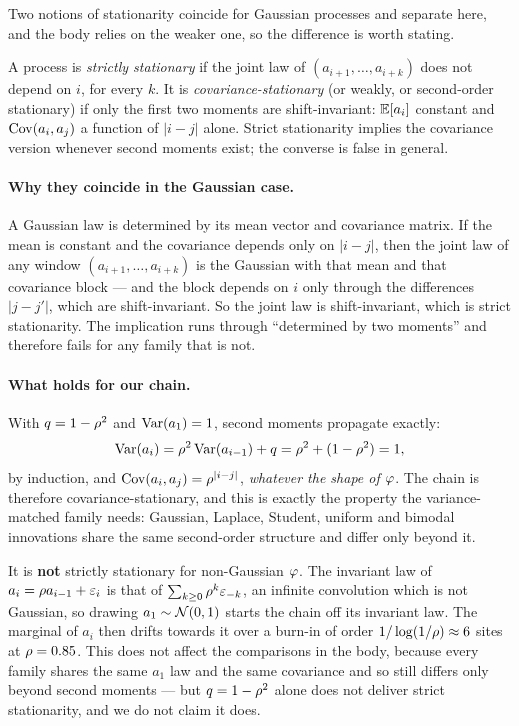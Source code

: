 Two notions of stationarity coincide for Gaussian processes and separate here, and the body
relies on the weaker one, so the difference is worth stating.

A process is \emph{strictly stationary} if the joint law of $(a_{i+1},\dots,a_{i+k})$ does not
depend on $i$, for every $k$. It is \emph{covariance-stationary} (or weakly, or second-order
stationary) if only the first two moments are shift-invariant: $\mathbb{E}[a_i]$ constant and
$\operatorname{Cov}(a_i,a_j)$ a function of $|i-j|$ alone. Strict stationarity implies the covariance version
whenever second moments exist; the converse is false in general.

\paragraph{Why they coincide in the Gaussian case.} A Gaussian law is determined by its mean
vector and covariance matrix. If the mean is constant and the covariance depends only on $|i-j|$,
then the joint law of any window $(a_{i+1},\dots,a_{i+k})$ is the Gaussian with that mean and that
covariance block --- and the block depends on $i$ only through the differences $|j-j'|$, which are
shift-invariant. So the joint law is shift-invariant, which is strict stationarity. The
implication runs through ``determined by two moments'' and therefore fails for any family that is
not.

\paragraph{What holds for our chain.} With $q=1-\rho^2$ and $\operatorname{Var}(a_1)=1$, second moments
propagate exactly:
\[
\operatorname{Var}(a_i) = \rho^2\operatorname{Var}(a_{i-1}) + q = \rho^2 + (1-\rho^2) = 1 ,
\]
by induction, and $\operatorname{Cov}(a_i,a_j)=\rho^{|i-j|}$, \emph{whatever the shape of $\varphi$}. The chain
is therefore covariance-stationary, and this is exactly the property the variance-matched family
needs: Gaussian, Laplace, Student, uniform and bimodal innovations share the same second-order
structure and differ only beyond it.

It is \textbf{not} strictly stationary for non-Gaussian $\varphi$. The invariant law of
$a_i=\rho a_{i-1}+\varepsilon_i$ is that of $\sum_{k\ge0}\rho^k\varepsilon_{-k}$, an infinite
convolution which is not Gaussian, so drawing $a_1\sim\mathcal{N}\!\left(0,1\right)$ starts the chain off its
invariant law. The marginal of $a_i$ then drifts towards it over a burn-in of order
$1/\log(1/\rho)\approx 6$ sites at $\rho=0.85$. This does not affect the comparisons in the
body, because every family shares the same $a_1$ law and the same covariance and so still differs
only beyond second moments --- but $q=1-\rho^2$ alone does not deliver strict stationarity,
and we do not claim it does.

